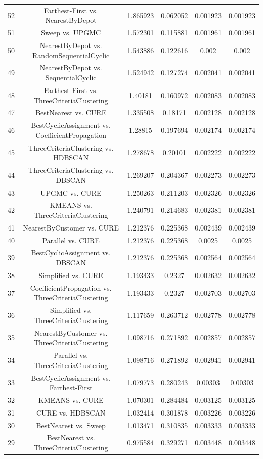 \documentclass[a4paper,10pt]{article}
\begin{document}
\begin{landscape}
\begin{table}[!htp]
\begin{tabular}{cccccc}
52&Farthest-First vs. NearestByDepot&1.865923&0.062052&0.001923&0.001923\\
51&Sweep vs. UPGMC&1.572301&0.115881&0.001961&0.001961\\
50&NearestByDepot vs. RandomSequentialCyclic&1.543886&0.122616&0.002&0.002\\
49&NearestByDepot vs. SequentialCyclic&1.524942&0.127274&0.002041&0.002041\\
48&Farthest-First vs. ThreeCriteriaClustering&1.40181&0.160972&0.002083&0.002083\\
47&BestNearest vs. CURE&1.335508&0.18171&0.002128&0.002128\\
46&BestCyclicAssignment vs. CoefficientPropagation&1.28815&0.197694&0.002174&0.002174\\
45&ThreeCriteriaClustering vs. HDBSCAN&1.278678&0.20101&0.002222&0.002222\\
44&ThreeCriteriaClustering vs. DBSCAN&1.269207&0.204367&0.002273&0.002273\\
43&UPGMC vs. CURE&1.250263&0.211203&0.002326&0.002326\\
42&KMEANS vs. ThreeCriteriaClustering&1.240791&0.214683&0.002381&0.002381\\
41&NearestByCustomer vs. CURE&1.212376&0.225368&0.002439&0.002439\\
40&Parallel vs. CURE&1.212376&0.225368&0.0025&0.0025\\
39&BestCyclicAssignment vs. DBSCAN&1.212376&0.225368&0.002564&0.002564\\
38&Simplified vs. CURE&1.193433&0.2327&0.002632&0.002632\\
37&CoefficientPropagation vs. ThreeCriteriaClustering&1.193433&0.2327&0.002703&0.002703\\
36&Simplified vs. ThreeCriteriaClustering&1.117659&0.263712&0.002778&0.002778\\
35&NearestByCustomer vs. ThreeCriteriaClustering&1.098716&0.271892&0.002857&0.002857\\
34&Parallel vs. ThreeCriteriaClustering&1.098716&0.271892&0.002941&0.002941\\
33&BestCyclicAssignment vs. Farthest-First&1.079773&0.280243&0.00303&0.00303\\
32&KMEANS vs. CURE&1.070301&0.284484&0.003125&0.003125\\
31&CURE vs. HDBSCAN&1.032414&0.301878&0.003226&0.003226\\
30&BestNearest vs. Sweep&1.013471&0.310835&0.003333&0.003333\\
29&BestNearest vs. ThreeCriteriaClustering&0.975584&0.329271&0.003448&0.003448\\

\end{tabular}
\end{table}
\end{landscape}
\end{document}
